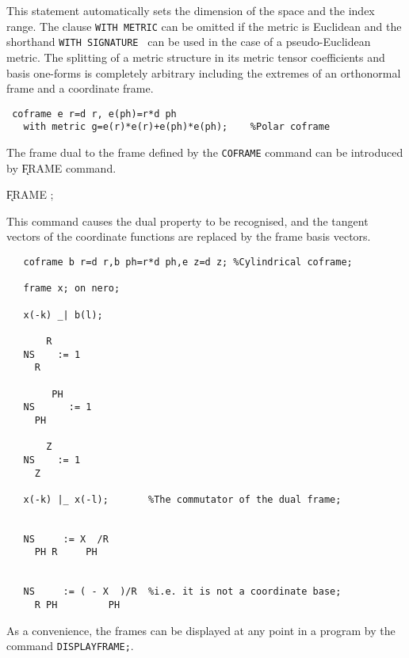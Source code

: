 \documentclass[11pt,letterpaper]{book}
\begin{document}
This statement automatically sets the dimension of the space and the
index range. The clause {\tt WITH METRIC} can be omitted if the metric
is Euclidean and the shorthand {\tt WITH SIGNATURE }
\label{SIGNATURE} can be used in the case of a pseudo-Euclidean
metric. The splitting of a metric structure in its metric tensor
coefficients and basis one-forms is completely arbitrary including the
extremes of an orthonormal frame and a coordinate frame.

\newpage
\example{}

{\small\begin{verbatim}
 coframe e r=d r, e(ph)=r*d ph
   with metric g=e(r)*e(r)+e(ph)*e(ph);    %Polar coframe
\end{verbatim}}

The frame dual to the frame defined by the {\tt COFRAME} command can
be introduced by \k{FRAME} command.

\hspace*{2em} \k{FRAME} ;\label{FRAME}

This command causes the
dual property to be recognised, and the tangent vectors of the
coordinate functions are replaced by the frame basis vectors.

\example{}

{\small\begin{verbatim}
   coframe b r=d r,b ph=r*d ph,e z=d z; %Cylindrical coframe;

   frame x; on nero;

   x(-k) _| b(l);

       R
   NS    := 1
     R

        PH
   NS      := 1
     PH

       Z
   NS    := 1
     Z

   x(-k) |_ x(-l);       %The commutator of the dual frame;


   NS     := X  /R
     PH R     PH


   NS     := ( - X  )/R  %i.e. it is not a coordinate base;
     R PH         PH

\end{verbatim}}

As a convenience, the frames can be displayed at any point in a program
by the command {\tt DISPLAYFRAME;}\label{DISPLAYFRAME}.
\end{document}
